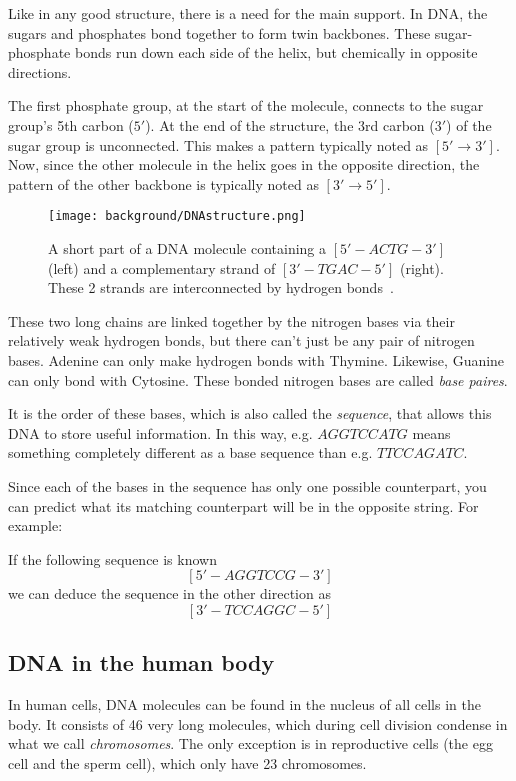 Like in any good structure, there is a need for the main support. In DNA, the sugars and phosphates bond together to form twin backbones. These sugar-phosphate bonds run down each side of the helix, but chemically in opposite directions. 

The first phosphate group, at the start of the molecule, connects to the sugar group's 5th carbon ($5'$). At the end of the structure, the 3rd carbon ($3'$) of the sugar group is unconnected. This makes a pattern typically noted as $[5' \rightarrow 3']$. Now, since the other molecule in the helix goes in the opposite direction, the pattern of the other backbone is typically noted as $[3' \rightarrow 5']$.

\begin{figure}[H]
	\centering
	\texttt{[image: background/DNAstructure.png]}
	\caption{A short part of a DNA molecule containing a $[5' - ACTG - 3']$ (left) and a complementary strand of $[3' - TGAC - 5']$ (right). These 2 strands are interconnected by hydrogen bonds~\cite{dnachemical}.}
	\label{fig:DNAstructure}
\end{figure}

These two long chains are linked together by the nitrogen bases via their relatively weak hydrogen bonds, but there can't just be any pair of nitrogen bases. Adenine can only make hydrogen bonds with Thymine. Likewise, Guanine can only bond with Cytosine. These bonded nitrogen bases are called \emph{base paires}.

It is the order of these bases, which is also called the \emph{sequence}, that allows this DNA to store useful information. In this way, e.g. $AGGTCCATG$ means something completely different as a base sequence than e.g. $TTCCAGATC$.

Since each of the bases in the sequence has only one possible counterpart, you can predict what its matching counterpart will be in the opposite string. For example:

If the following sequence is known
$$[5' - AGGTCCG - 3']$$
we can deduce the sequence in the other direction as
$$[3' - TCCAGGC - 5']$$

\subsection{DNA in the human body}

In human cells, DNA molecules can be found in the nucleus of all cells in the body. It consists of 46 very long molecules, which during cell division condense in what we call \emph{chromosomes}. The only exception is in reproductive cells (the egg cell and the sperm cell), which only have 23 chromosomes. 

